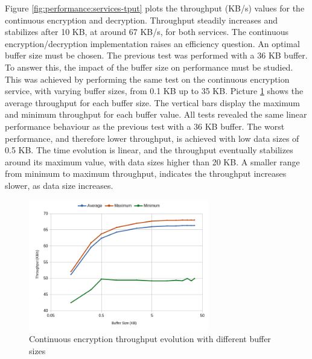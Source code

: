 Figure \ref{fig:performance:services-tput} plots the throughput (KB/s) values for the continuous encryption and decryption. Throughput steadily increases and stabilizes after 10 KB, at around 67 KB/s, for both services.
The continuous encryption/decryption implementation raises an efficiency question. An optimal buffer size must be chosen. The previous test was performed with a 36 KB buffer.
To answer this, the impact of the buffer size on performance must be studied.
This was achieved by performing the same test on the continuous encryption service, with varying buffer sizes, from 0.1 KB up to 35 KB. Picture \ref{fig:performance:buffer-tput} shows the average throughput for each buffer size. The vertical bars display the maximum and minimum throughput for each buffer value.
All tests revealed the same linear performance behaviour as the previous test with a 36 KB buffer. The worst performance, and therefore lower throughput, is achieved with low data sizes of 0.5 KB. The time evolution is linear, and the throughput eventually stabilizes around its maximum value, with data sizes higher than 20 KB.
A smaller range from minimum to maximum throughput, indicates the throughput increases slower, as data size increases. 

\begin{figure}[h!]
	\centering
	\includegraphics[width=0.7\textwidth]{./Images/buffer-tput.png}
	\caption{Continuous encryption throughput evolution with different buffer sizes}
	\label{fig:performance:buffer-tput}
\end{figure}


